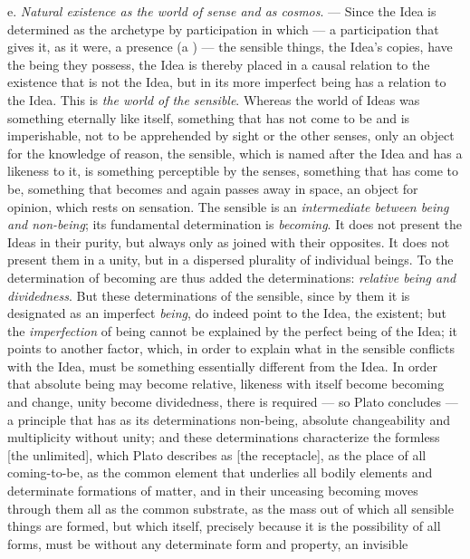 e. \emph{Natural existence as the world of sense and as cosmos}. --- Since the Idea is
determined as the archetype by participation in which --- a participation that gives it,
as it were, a presence (a ) --- the sensible things, the Idea's copies, have
the being they possess, the Idea is thereby placed in a causal relation to the existence
that is not the Idea, but in its more imperfect being has a relation to the Idea. This is
\emph{the world of the sensible}. Whereas the world of Ideas was something eternally like
itself, something that has not come to be and is imperishable, not to be apprehended by
sight or the other senses, only an object for the knowledge of reason, the sensible, which
is named after the Idea and has a likeness to it, is something perceptible by
the senses, something that has come to be,
something that becomes and again passes away in space, an object for opinion, which rests
on sensation. The sensible is an \emph{intermediate between being and non-being}; its
fundamental determination is \emph{becoming}. It does not present the Ideas in their
purity, but always only as joined with their opposites. It does not present them in a
unity, but in a dispersed plurality of individual beings. To the determination of becoming
are thus added the determinations: \emph{relative being and dividedness}. But these
determinations of the sensible, since by them it is designated as an imperfect
\emph{being}, do indeed point to the Idea, the existent; but the \emph{imperfection} of
being cannot be explained by the perfect being of the Idea; it points to another factor,
which, in order to explain what in the sensible conflicts with the Idea, must be something
essentially different from the Idea. In order that absolute being may become relative,
likeness with itself become becoming and change, unity become dividedness, there is
required --- so Plato concludes --- a principle that has as its determinations non-being,
absolute changeability and multiplicity without unity; and these determinations
characterize the formless  [the unlimited], which Plato describes as
 [the receptacle], as the place of all coming-to-be, as the common element
that underlies all bodily elements and determinate formations of matter, and in their
unceasing becoming moves through them all as the common substrate, as the mass out of
which all sensible things are formed, but which itself, precisely because it is the
possibility of all forms, must be without any determinate form and property, an invisible
